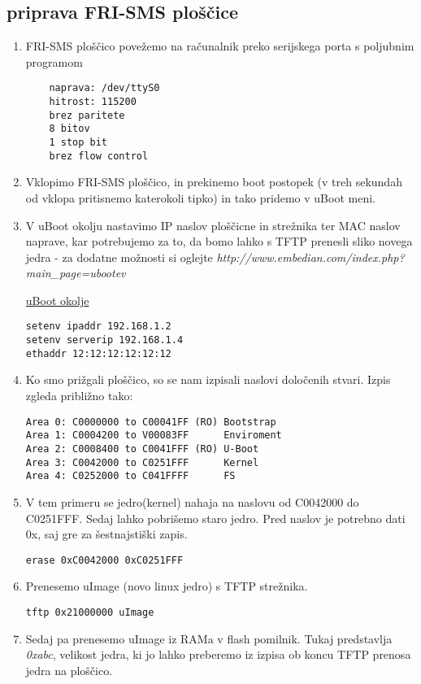 \documentclass[10pt,a4paper]{article}
\begin{document}
\subsection{priprava FRI-SMS ploščice}
\begin{enumerate}
	\item FRI-SMS ploščico povežemo na računalnik preko serijskega porta s poljubnim programom
		\begin{lstlisting}
    naprava: /dev/ttyS0
    hitrost: 115200
    brez paritete
    8 bitov
    1 stop bit
    brez flow control
		\end{lstlisting}
	\item Vklopimo FRI-SMS ploščico, in prekinemo boot postopek (v treh sekundah od vklopa pritisnemo katerokoli tipko) in tako pridemo v uBoot meni.
	\item V uBoot okolju nastavimo IP naslov ploščicne in strežnika ter MAC naslov naprave, kar potrebujemo za to, da bomo lahko s TFTP prenesli sliko novega jedra - za dodatne možnosti si oglejte \emph{http://www.embedian.com/index.php?main\_page=ubootev}
		\begin{center}
			\href{http://www.embedian.com/index.php?main\_page=ubootev}{uBoot okolje}
		\end{center}
		\begin{lstlisting}
setenv ipaddr 192.168.1.2
setenv serverip 192.168.1.4
ethaddr 12:12:12:12:12:12
		\end{lstlisting}
	\item Ko smo prižgali ploščico, so se nam izpisali naslovi določenih stvari. Izpis zgleda približno tako:
		\begin{lstlisting}
Area 0: C0000000 to C00041FF (RO) Bootstrap
Area 1: C0004200 to V00083FF      Enviroment
Area 2: C0008400 to C0041FFF (RO) U-Boot
Area 3: C0042000 to C0251FFF      Kernel
Area 4: C0252000 to C041FFFF      FS
		\end{lstlisting}
	\item V tem primeru se jedro(kernel) nahaja na naslovu od C0042000 do C0251FFF. Sedaj lahko pobrišemo staro jedro. Pred naslov je potrebno dati 0x, saj gre za šestnajstiški zapis.
		\begin{lstlisting}
erase 0xC0042000 0xC0251FFF
		\end{lstlisting}
	\item Prenesemo uImage (novo linux jedro) s TFTP strežnika.
		\begin{lstlisting}
tftp 0x21000000 uImage 
		\end{lstlisting}
	\item Sedaj pa prenesemo uImage iz RAMa v flash pomilnik. Tukaj predstavlja \emph{0xabc}, velikost jedra, ki jo lahko preberemo iz izpisa ob koncu TFTP prenosa jedra na ploščico.

\end{enumerate}
\end{document}
